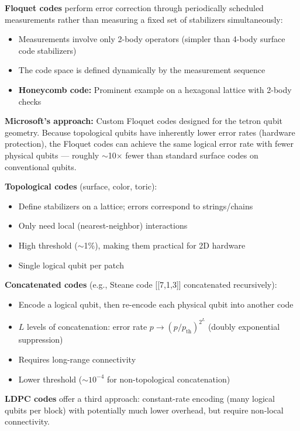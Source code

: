 \documentclass[11pt,a4paper]{article}
\begin{document}
\begin{answerbox}
\textbf{Floquet codes} perform error correction through periodically scheduled measurements rather than measuring a fixed set of stabilizers simultaneously:
\begin{itemize}
    \item Measurements involve only 2-body operators (simpler than 4-body surface code stabilizers)
    \item The code space is defined dynamically by the measurement sequence
    \item \textbf{Honeycomb code:} Prominent example on a hexagonal lattice with 2-body checks
\end{itemize}
\textbf{Microsoft's approach:} Custom Floquet codes designed for the tetron qubit geometry. Because topological qubits have inherently lower error rates (hardware protection), the Floquet codes can achieve the same logical error rate with fewer physical qubits --- roughly $\sim$10$\times$ fewer than standard surface codes on conventional qubits.
\end{answerbox}

\begin{answerbox}
\textbf{Topological codes} (surface, color, toric):
\begin{itemize}
    \item Define stabilizers on a lattice; errors correspond to strings/chains
    \item Only need local (nearest-neighbor) interactions
    \item High threshold ($\sim$1\%), making them practical for 2D hardware
    \item Single logical qubit per patch
\end{itemize}

\textbf{Concatenated codes} (e.g., Steane code [[7,1,3]] concatenated recursively):
\begin{itemize}
    \item Encode a logical qubit, then re-encode each physical qubit into another code
    \item $L$ levels of concatenation: error rate $p \to (p/p_{\text{th}})^{2^L}$ (doubly exponential suppression)
    \item Requires long-range connectivity
    \item Lower threshold ($\sim 10^{-4}$ for non-topological concatenation)
\end{itemize}
\textbf{LDPC codes} offer a third approach: constant-rate encoding (many logical qubits per block) with potentially much lower overhead, but require non-local connectivity.
\end{answerbox}
\end{document}
